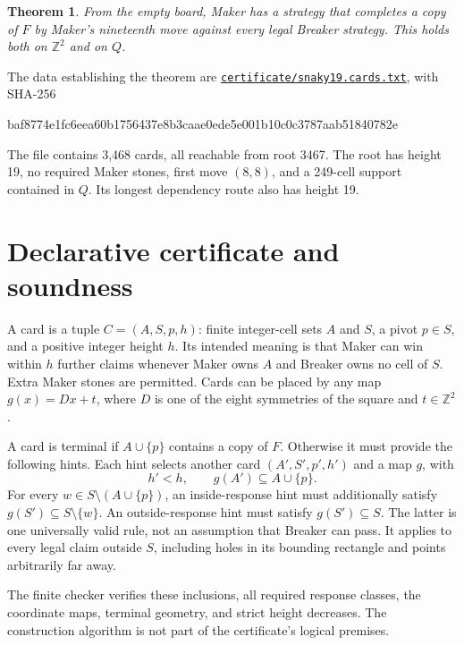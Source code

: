 \documentclass[11pt]{amsart}
\newtheorem{theorem}{Theorem}[section]
\newcommand{\Z}{\mathbb Z}
\newcommand{\artifact}[2]{\href{https://github.com/shjvandekamp/math/blob/main/topics/snaky/#1}{#2}}
\begin{document}
\begin{theorem}\label{thm:main}
From the empty board, Maker has a strategy that completes a copy of $F$ by
Maker's nineteenth move against every legal Breaker strategy. This holds
both on $\Z^2$ and on $Q$.
\end{theorem}

The data establishing the theorem are
\artifact{certificate/snaky19.cards.txt}{\nolinkurl{certificate/snaky19.cards.txt}},
with SHA-256
\begin{center}\footnotesize\ttfamily
baf8774e1fc6eea60b1756437e8b3caae0ede5e001b10c0c3787aab51840782e
\end{center}
The file contains 3,468 cards, all reachable from root 3467. The root has
height 19, no required Maker stones, first move $(8,8)$, and a 249-cell support
contained in $Q$. Its longest dependency route also has height 19.

\section{Declarative certificate and soundness}
A card is a tuple $C=(A,S,p,h)$: finite integer-cell sets $A$ and $S$, a pivot
$p\in S$, and a positive integer height $h$. Its intended meaning is that
Maker can win within $h$ further claims whenever Maker owns $A$ and Breaker
owns no cell of $S$. Extra Maker stones are permitted. Cards can be placed
by any map $g(x)=Dx+t$, where $D$ is one of the eight symmetries of the square
and $t\in\Z^2$.

A card is terminal if $A\cup\{p\}$ contains a copy of $F$. Otherwise it must
provide the following hints. Each hint selects another card
$(A',S',p',h')$ and a map $g$, with
\begin{equation}\label{eq:hint}
 h'<h,\qquad g(A')\subseteq A\cup\{p\}.
\end{equation}
For every $w\in S\setminus(A\cup\{p\})$, an inside-response hint must
additionally satisfy $g(S')\subseteq S\setminus\{w\}$. An outside-response
hint must satisfy $g(S')\subseteq S$. The latter is one universally valid
rule, not an assumption that Breaker can pass. It applies to every legal
claim outside $S$, including holes in its bounding rectangle and points
arbitrarily far away.

The finite checker verifies these inclusions, all required response classes,
the coordinate maps, terminal geometry, and strict height decreases. The
construction algorithm is not part of the certificate's logical premises.
\end{document}
